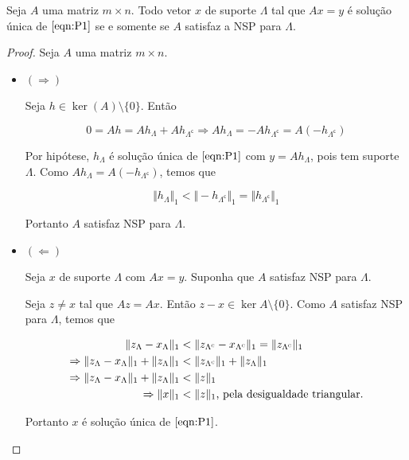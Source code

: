 \begin{teorema}
Seja $A$ uma matriz $m \times n$. Todo vetor $x$ de suporte $\Lambda$ tal que $Ax = y$ é solução única de $\eqref{eqn:P1}$ se e somente se $A$ satisfaz a NSP para $\Lambda$.
\label{thm:TeoremaNSP}
\end{teorema}
\begin{proof}
Seja $A$ uma matriz $m \times n$.
\begin{itemize}

\item $( \Rightarrow )$

Seja $h \in \ker(A) \setminus \lbrace 0 \rbrace$. Então

$$ 0 = Ah = Ah_{\Lambda} + Ah_{\Lambda^{\mathsf{c}}} \Rightarrow Ah_{\Lambda} = - Ah_{\Lambda^{\mathsf{c}}} = A( -h_{\Lambda^{\mathsf{c}}} )$$

Por hipótese, $h_{\Lambda}$ é solução única de $\eqref{eqn:P1}$ com $y = Ah_{\Lambda}$, pois tem suporte $\Lambda$. Como $Ah_{\Lambda} = A( -h_{\Lambda^{\mathsf{c}}} )$, temos que

$$ \Vert h_{\Lambda} \Vert_1 < \Vert - h_{\Lambda^{\mathsf{c}}} \Vert_1
= \Vert h_{\Lambda^{\mathsf{c}}} \Vert_1 $$

Portanto $A$ satisfaz NSP para $\Lambda$.

\item $( \Leftarrow )$

Seja $x$ de suporte $\Lambda$ com $Ax = y$. Suponha que $A$ satisfaz NSP para $\Lambda$.

Seja $z \neq x$ tal que $Az = Ax$. Então $z - x \in \ker{A} \setminus \lbrace 0 \rbrace$. Como $A$ satisfaz NSP para $\Lambda$, temos que

\begin{subequations}
\begin{align*}
\Vert z_{\Lambda} - x_{\Lambda} \Vert_1 &< \Vert z_{\Lambda^{\textsc{c}}} - x_{\Lambda^{\textsc{c}}} \Vert_1
 = \Vert z_{\Lambda^{\textsc{c}}} \Vert_1 \\
\Rightarrow \Vert z_{\Lambda} - x_{\Lambda} \Vert_1 + \Vert z_{\Lambda} \Vert_1 &< \Vert z_{\Lambda^{\textsc{c}}} \Vert_1 + \Vert z_{\Lambda} \Vert_1 \\
\Rightarrow \Vert z_{\Lambda} - x_{\Lambda} \Vert_1 + \Vert z_{\Lambda} \Vert_1 & < \Vert z \Vert_1 \\
\Rightarrow \Vert x \Vert_1 &< \Vert z \Vert_1 \text{, pela desigualdade triangular.}
\end{align*}
\end{subequations}

Portanto $x$ é solução única de $\eqref{eqn:P1}$.



\end{itemize}
\end{proof}


